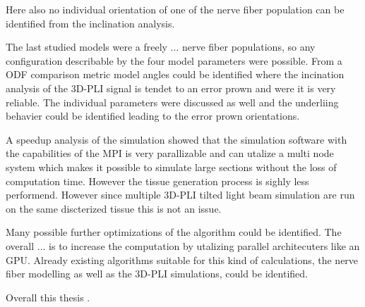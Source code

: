 Here also no individual orientation of one of the nerve fiber population can be identified from the inclination analysis.
\par
% 
The last studied models were a freely ... nerve fiber populations, so any configuration describable by the four model parameters were possible.
From a \ac{ODF} comparison metric model angles could be identified where the incination analysis of the \ac{3D-PLI} signal is tendet to an error prown and were it is very reliable.
The individual parameters were discussed as well and the underliing behavier could be identified leading to the error prown orientations.
\par
% 
A speedup analysis of the simulation showed that the simulation software with the capabilities of the \ac{MPI} is very parallizable and can utalize a multi node system which makes it possible to simulate large sections without the loss of computation time.
However the tissue generation process is sighly less performend.
However since multiple \ac{3D-PLI} tilted light beam simulation are run on the same discterized tissue this is not an issue.
\par
% 
Many possible further optimizations of the algorithm could be identified.
The overall ... is to increase the computation by utalizing parallel architecuters like an \ac{GPU}.
Already existing algorithms suitable for this kind of calculations, the nerve fiber modelling as well as the \ac{3D-PLI} simulations, could be identified.
\par
% 
Overall this thesis \dummy{}.